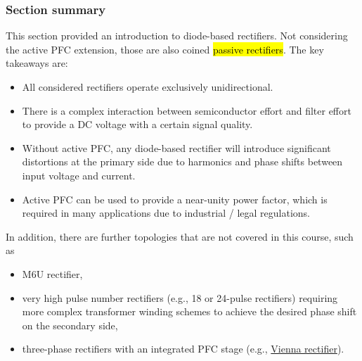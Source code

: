 \begin{frame}
    \frametitle{Section summary}
    This section provided an introduction to diode-based rectifiers. Not considering the active PFC extension, those are also coined \hl{passive rectifiers}. \pause The key takeaways are:
    \begin{itemize}
        \item All considered rectifiers operate exclusively unidirectional.\pause
        \item There is a complex interaction between semiconductor effort and filter effort to provide a DC voltage with a certain signal quality.\pause
        \item Without active PFC, any diode-based rectifier will introduce significant distortions at the primary side due to harmonics and phase shifts between input voltage and current.\pause
        \item Active PFC can be used to provide a near-unity power factor, which is required in many applications due to industrial / legal regulations.\pause
    \end{itemize}
    In addition, there are further topologies that are not covered in this course, such as
    \begin{itemize}
        \item M6U rectifier,
        \item very high pulse number rectifiers (e.g., 18 or 24-pulse rectifiers) requiring more complex transformer winding schemes to achieve the desired phase shift on the secondary side,
        \item three-phase rectifiers with an integrated PFC stage (e.g., \href{https://en.wikipedia.org/wiki/Vienna_rectifier}{Vienna rectifier}).
    \end{itemize}
\end{frame}